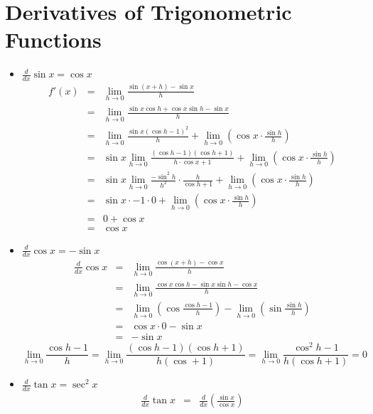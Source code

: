 \section{Derivatives of Trigonometric Functions}
\begin{itemize}
\item $\displaystyle \frac{d}{dx} \sin x = \cos x$
$$\begin{array}{rcl}
\displaystyle f'(x) & = & \displaystyle \lim_{h \to 0} \frac{\sin (x+h) - \sin x}{h}\\
& = & \displaystyle \lim_{h \to 0} \frac{\sin x \cos h + \cos x \sin h -\sin x}{h}\\
& = & \displaystyle \lim_{h \to 0} \frac{\sin x (\cos h - 1)^2}{h} + \lim_{h \to 0} (\cos x \cdot \frac{\sin h}{h})\\
& = & \displaystyle \sin x \lim_{h \to 0} \frac{(\cos h -1)(\cos h +1)}{h \cdot \cos x + 1} + \lim_{h \to 0} (\cos x \cdot \frac{\sin h}{h})\\
& = & \displaystyle \sin x \lim_{h \to 0} \frac{- \sin ^2 h}{h^2} \cdot \frac{h}{\cos h + 1} + \lim_{h \to 0} (\cos x \cdot \frac{\sin h}{h})\\
& = & \displaystyle \sin x \cdot -1 \cdot 0 + \lim_{h \to 0} (\cos x \cdot \frac{\sin h}{h})\\
& = & \displaystyle 0 + \cos x\\
& = & \displaystyle \cos x
\end{array}$$
\item $\displaystyle \frac{d}{dx} \cos x = - \sin x$
$$\begin{array}{rcl}
\displaystyle \frac{d}{dx} \cos x & = & \displaystyle \lim_{h \to 0} \frac{\cos (x+h) - \cos x}{h}\\
& = & \displaystyle \lim_{h \to 0} \frac{\cos x \cos h - \sin x \sin h - \cos x}{h}\\
& = & \displaystyle \lim_{h \to 0} (\cos \frac{\cos h - 1}{h}) - \lim_{h \to 0} (\sin \frac{\sin h }{h})\\
& = & \displaystyle \cos x \cdot 0 - \sin x \\
& = & \displaystyle - \sin x
\end{array}$$
$$\displaystyle \lim_{h \to 0} \frac{\cos h -1}{h} = \lim_{h \to 0} \frac{(\cos h - 1)(\cos h +1)}{h(\cos +1)} = \lim_{h \to 0} \frac{\cos ^2 h - 1}{h(\cos h +1)} = 0$$
\item $\displaystyle \frac{d}{dx} \tan x = \sec ^2 x$
$$\begin{array}{rcl}
\displaystyle \frac{d}{dx} \tan x & = & \displaystyle \frac{d}{dx} (\frac{\sin x }{\cos  x})\\

\end{array}$$
\end{itemize}
